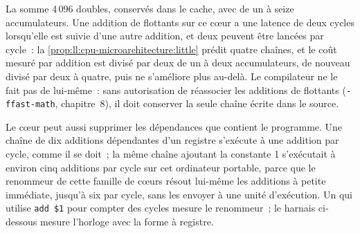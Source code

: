 La  somme 4\,096 doubles, conservés dans le cache, avec de un à seize accumulateurs. Une
addition de flottants sur ce cœur a une latence de deux cycles lorsqu'elle est suivie d'une autre addition, et deux peuvent être lancées
par cycle~: la \cref{prop:ll:cpu-microarchitecture:little} prédit quatre chaînes, et le coût mesuré par addition est divisé par deux
de un à deux accumulateurs, de nouveau divisé par deux à quatre, puis ne s'améliore plus au-delà. Le compilateur ne le fait pas de lui-même~:
sans autorisation de réassocier les additions de flottants (\texttt{-ffast-math}, chapitre~8), il doit conserver la seule
chaîne écrite dans le source.

\begin{omfigure}

\label{fig:ll:cpu-microarchitecture:chains}
\end{omfigure}

Le cœur peut aussi supprimer les dépendances que contient le programme. Une chaîne de dix additions dépendantes d'un registre s'exécute à
une addition par cycle, comme il se doit~; la même chaîne ajoutant la constante 1 s'exécutait à environ cinq additions par
cycle sur cet ordinateur portable, parce que le renommeur de cette famille de cœurs résout lui-même les additions à petite immédiate, jusqu'à six par cycle, sans
les envoyer à une unité d'exécution. Un  qui utilise \texttt{add \$1} pour compter des cycles mesure le renommeur~;
le harnais ci-dessous mesure l'horloge avec la forme à registre.

